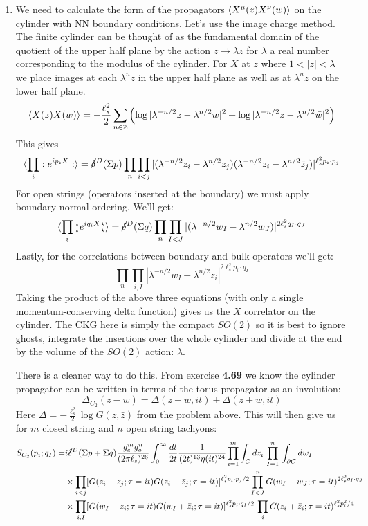 \documentclass[11pt, class=article, crop=false]{standalone}
\begin{document}
\begin{enumerate}
	\item
	We need to calculate the form of the propagators $\braket{X^\mu(z) X^\nu(w)}$ on the cylinder with NN boundary conditions. Let's use the image charge method. The finite cylinder can be thought of as the fundamental domain of the quotient of the upper half plane by the action $z \to \lambda z$ for $\lambda$ a real number corresponding to the modulus of the cylinder. For $X$ at $z$ where $1<|z|<\lambda$ we place images at each $\lambda^n z$ in the upper half plane as well as at $\lambda^n \bar z$ on the lower half plane. 
	\[
		\braket{X(z) X(w)} = - \frac{\ell_s^2}{2} \sum_{n \in \mathbb{Z}} \left( \log|\lambda^{-n/2} z - \lambda^{n/2} w|^2 +  \log|\lambda^{-n/2} z - \lambda^{n/2} \bar w|^2 \right)
	\]
	This gives
	\[
		\braket{\prod_{i} :e^{i p_i X}:} = \cancel\delta^D(\Sigma p) \prod_{n} \prod_{i < j} |(\lambda^{-n/2} z_i - \lambda^{n/2} z_j) (\lambda^{-n/2} z_i - \lambda^{n/2} \bar z_j)|^{\ell_s^2 p_i \cdot p_j}
	\]
	For open strings (operators inserted at the boundary) we must apply boundary normal ordering. We'll get:
	\[
		\braket{\prod_{i} {_\star^\star} e^{i q_i X} {^\star_\star} } = \cancel\delta^D(\Sigma q) \prod_{n} \prod_{I < J} |(\lambda^{-n/2} w_I - \lambda^{n/2} w_J)|^{2 \ell_s^2 q_I \cdot q_J}
	\]	
	Lastly, for the correlations between boundary and bulk operators we'll get:
	\[
		\prod_n \prod_{i, I} |\lambda^{-n/2} w_I - \lambda^{n/2} z_i|^{2 \ell_s^2 p_i \cdot q_I}
	\]
	Taking the product of the above three equations (with only a single momentum-conserving delta function) gives us the $X$ correlator on the cylinder. The CKG here is simply the compact $SO(2)$ so it is best to ignore ghosts, integrate the insertions over the whole cylinder and divide at the end by the volume of the $SO(2)$ action: $\lambda$. 
	
	There is a cleaner way to do this. From exercise \textbf{4.69} we know the cylinder propagator can be written in terms of the torus propagator as an involution:
	\[
		\Delta_{C_2}(z- w) = \Delta(z - w, i t) + \Delta(z + \bar w, i t)
	\]
	Here $\Delta = -\frac{\ell_s^2}{2} \log G(z, \bar z)$ from the problem above. This will then give us for $m$ closed string and $n$ open string tachyons:
	\[
	\begin{aligned}
		S_{C_2}(p_i; q_I)
		= & i \cancel\delta^D(\Sigma p + \Sigma q) \frac{g_c^m g_o^n}{(2\pi \ell_s)^{26}} \int_0^\infty \frac{dt}{2t} \frac{1}{(2t)^{13} \eta(i t)^{24}} \prod_{i=1}^m \int_{C} dz_i \, \prod_{I=1}^n \, \int_{\partial C} dw_I  \\
		& \times \prod_{i<j} [G(z_i-z_j; \tau = it) G(z_i + \bar z_j; \tau = it)]^{\ell_s^2 p_i \cdot p_j/2}  \prod_{I<J}^n G(w_I-w_J; \tau = it)^{2 \ell_s^2 q_I \cdot q_J}\\
		& \times \prod_{i, I} [G(w_I - z_i; \tau = it) G(w_I + \bar z_i; \tau = i t)]^{\ell_s^2 p_i \cdot q_I/2} \, \prod_{i} G(z_i + \bar z_i; \tau = i t)^{\ell_s^2 p_i^2/4}
	\end{aligned}
	\]
	

\end{enumerate}
\end{document}
